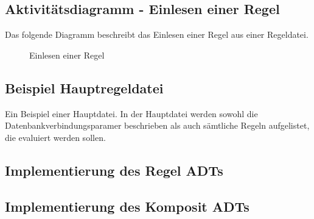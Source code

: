 \subsection{Aktivitätsdiagramm - Einlesen einer Regel}
\label{app:AktivitaetRegelEinlesen}
Das folgende Diagramm beschreibt das Einlesen einer Regel aus einer Regeldatei.
\begin{figure}[htb]
\centering
{}
\caption{Einlesen einer Regel}
\end{figure}
\clearpage

\subsection{Beispiel Hauptregeldatei}
\label{app:MasterDatei}
Ein Beispiel einer Hauptdatei. In der Hauptdatei werden sowohl die Datenbankverbindungsparamer beschrieben als auch sämtliche Regeln aufgelistet, die evaluiert werden sollen.


\subsection{Implementierung des Regel \acs{ADT}s}
\label{app:RegelADT}

\clearpage

\subsection{Implementierung des Komposit \acs{ADT}s}
\label{app:CompositeADT}



